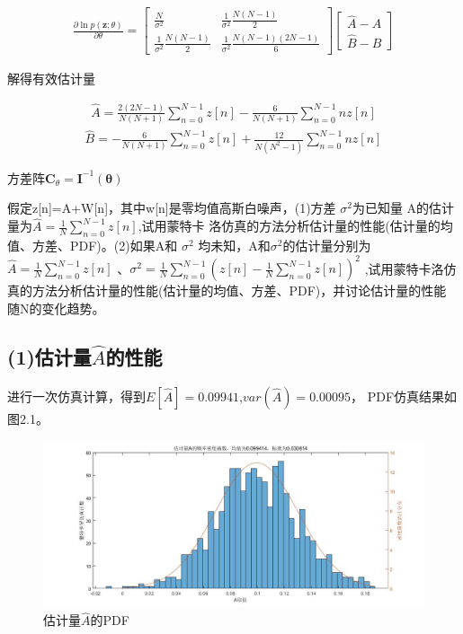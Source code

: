 \documentclass[fontset=windows]{article}
\numberwithin{figure}{section}
\begin{document}
\begin{align*}
    \frac{\partial \ln p(\mathbf{z};\theta)}{\partial \theta}=	\begin{bmatrix}
                                                                   \frac{N}{\sigma^2}                 & \frac{1}{\sigma^2}\frac{N(N-1)}{2}       \\
                                                                   \frac{1}{\sigma^2}\frac{N(N-1)}{2} & \frac{1}{\sigma^2}\frac{N(N-1)(2N-1)}{6}
                                                               \end{bmatrix}
    \begin{bmatrix}
        \hat{A}-A \\
        \hat{B}-B
    \end{bmatrix}
\end{align*}

解得有效估计量

\begin{align*}
    \hat{A}=\frac{2(2N-1)}{N(N+1)}\sum_{n=0}^{N-1}z[n]-\frac{6}{N(N+1)}\sum_{n=0}^{N-1}nz[n]
\end{align*}
\begin{align*}
    \hat{B}=-\frac{6}{N(N+1)}\sum_{n=0}^{N-1}z[n]+\frac{12}{N(N^2-1)}\sum_{n=0}^{N-1}nz[n]
\end{align*}

方差阵\(\mathbf{C}_{\theta}=\mathbf{I}^{-1}(\boldsymbol{\theta})\)

假定z[n]=A+W[n]，其中w[n]是零均值高斯白噪声，(1)方差 \(\sigma^2\)为已知量
A的估计量为\(\hat{A}=\frac{1}{N}\sum_{n = 0}^{N-1}z[n] \),试用蒙特卡
洛仿真的方法分析估计量的性能(估计量的均值、方差、PDF)。(2)如果A和 \(\sigma^2\)
均未知，A和\(\sigma^2\)的估计量分别为\(\hat{A}=\frac{1}{N}\sum_{n=0}^{N-1}z[n]\)
、\(\sigma^2=\frac{1}{N}\sum_{n=0}^{N-1}(z[n]-\frac{1}{N}\sum_{n=0}^{N-1}z[n])^2\)
,试用蒙特卡洛仿真的方法分析估计量的性能(估计量的均值、方差、PDF)，并讨论估计量的性能
随N的变化趋势。

\subsection*{(1)估计量\(\hat{A}\)的性能}

进行一次仿真计算，得到\(E[\hat{A}]=0.09941\),\(var(\hat{A})=0.00095\)，
PDF仿真结果如图2.1。
\begin{figure}[H]
    \centering
    \includegraphics[scale=0.4]{fig2.1.jpg}
    \caption{估计量\(\hat{A}\)的PDF}
    \label{2.1}
\end{figure}
\end{document}
